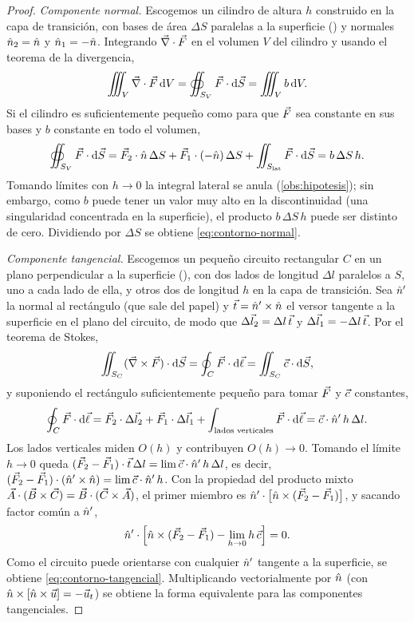 \begin{proof}
\emph{Componente normal.} Escogemos un cilindro de altura $h$ construido en la capa de transición, con bases de área $\Delta S$ paralelas a la superficie
() y normales $\hat{n}_2=\hat{n}$ y $\hat{n}_1=-\hat{n}$. Integrando $\vec{\nabla}\cdot\vec{F}$ en el volumen $V$ del cilindro y usando el teorema de la divergencia,
\[
  \iiint_{V}\vec{\nabla}\cdot\vec{F}\,\mathrm{d} V=\oiint_{S_V}\vec{F}\cdot\mathrm{d}\vec{S}=\iiint_{V}b\,\mathrm{d} V .
\]
Si el cilindro es suficientemente pequeño como para que $\vec{F}$ sea constante en sus bases y $b$ constante en todo el volumen,
\[
  \oiint_{S_V}\vec{F}\cdot\mathrm{d}\vec{S}=\vec{F}_2\cdot\hat{n}\,\Delta S+\vec{F}_1\cdot(-\hat{n})\,\Delta S+\iint_{S_{\mathrm{lat}}}\vec{F}\cdot\mathrm{d}\vec{S}=b\,\Delta S\,h .
\]
Tomando límites con $h\to0$ la integral lateral se anula (\cref{obs:hipotesis}); sin embargo, como $b$ puede tener un valor muy alto en la discontinuidad
(una singularidad concentrada en la superficie), el producto $b\,\Delta S\,h$ puede ser distinto de cero. Dividiendo por $\Delta S$ se obtiene \cref{eq:contorno-normal}.

\emph{Componente tangencial.} Escogemos un pequeño circuito rectangular $C$ en un plano perpendicular a la superficie (), con dos lados de longitud $\Delta l$
paralelos a $S$, uno a cada lado de ella, y otros dos de longitud $h$ en la capa de transición. Sea $\hat{n}'$ la normal al rectángulo (que sale del papel) y $\vec{t}=\hat{n}'\times\hat{n}$ el
versor tangente a la superficie en el plano del circuito, de modo que $\Delta\vec{l}_2=\Delta l\,\vec{t}$ y $\Delta\vec{l}_1=-\Delta l\,\vec{t}$. Por el teorema de Stokes,
\[
  \iint_{S_C}(\vec{\nabla}\times\vec{F})\cdot\mathrm{d}\vec{S}=\oint_{C}\vec{F}\cdot\mathrm{d}\vec{\ell}=\iint_{S_C}\vec{c}\cdot\mathrm{d}\vec{S},
\]
y suponiendo el rectángulo suficientemente pequeño para tomar $\vec{F}$ y $\vec{c}$ constantes,
\[
  \oint_{C}\vec{F}\cdot\mathrm{d}\vec{\ell}=\vec{F}_2\cdot\Delta\vec{l}_2+\vec{F}_1\cdot\Delta\vec{l}_1+\int_{\text{lados verticales}}\vec{F}\cdot\mathrm{d}\vec{\ell}=\vec{c}\cdot\hat{n}'\,h\,\Delta l .
\]
Los lados verticales miden $O(h)$ y contribuyen $O(h)\to0$. Tomando el límite $h\to0$ queda
$(\vec{F}_2-\vec{F}_1)\cdot\vec{t}\,\Delta l=\lim\vec{c}\cdot\hat{n}'\,h\,\Delta l$, es decir,
$(\vec{F}_2-\vec{F}_1)\cdot(\hat{n}'\times\hat{n})=\lim\vec{c}\cdot\hat{n}'\,h$. Con la propiedad del producto mixto
$\vec{A}\cdot(\vec{B}\times\vec{C})=\vec{B}\cdot(\vec{C}\times\vec{A})$, el primer miembro es
$\hat{n}'\cdot\bigl[\hat{n}\times(\vec{F}_2-\vec{F}_1)\bigr]$, y sacando factor común a $\hat{n}'$,
\[
  \hat{n}'\cdot\Bigl[\hat{n}\times(\vec{F}_2-\vec{F}_1)-\lim_{h\to0}h\,\vec{c}\Bigr]=0 .
\]
Como el circuito puede orientarse con cualquier $\hat{n}'$ tangente a la superficie, se obtiene \cref{eq:contorno-tangencial}. Multiplicando vectorialmente por $\hat{n}$ (con
$\hat{n}\times[\hat{n}\times\vec{u}]=-\vec{u}_t$) se obtiene la forma equivalente para las componentes tangenciales.
\end{proof}

